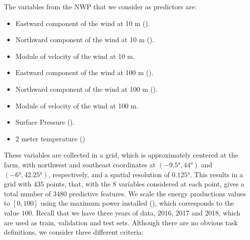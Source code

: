 The variables from the NWP that we consider as predictors are:
\begin{itemize}
    \item	Eastward component of the wind at {10 m} %
     ().
    \item	Northward  component of the wind at {10 m} ().
    \item   Module of velocity of the wind at 10 m.
    \item	Eastward  component of the wind at {100 m} ().
    \item	Northward component of the wind at {100 m} ().
    \item   Module of velocity of the wind at 100 m.
    \item   Surface {Pressure} ().
    \item	2 meter {temperature} ()
\end{itemize}
These variables are collected in a grid, which is approximately centered at the farm, with northwest and southeast coordinates at $(\ang{-9.5}, \ang{44})$ and $(\ang{-6}, \ang{42.25})$, respectively, and a spatial resolution of $\ang{0.125}$.
This results in a grid with $435$ points, that, with the $8$ variables considered at each point, gives a total number of {3480} predictive features.
We scale the energy productions values to $[0, 100]$ using the maximum power installed (), which corresponds to the value $100$.
%
Recall that we have three years of data, 2016, 2017 and 2018, which are used as train, validation and test sets.
%
Although there are no obvious task definitions, we consider three different criteria:
